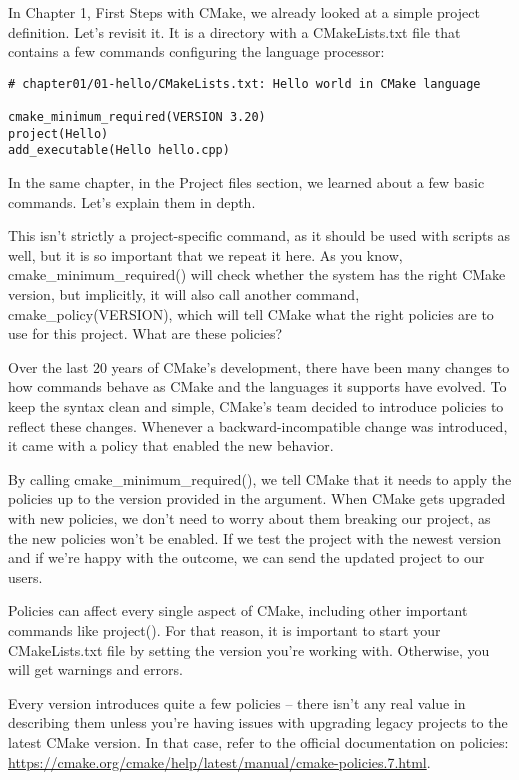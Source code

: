 
In Chapter 1, First Steps with CMake, we already looked at a simple project definition. Let's revisit it. It is a directory with a CMakeLists.txt file that contains a few commands configuring the language processor:

\begin{lstlisting}[style=styleCMake]
# chapter01/01-hello/CMakeLists.txt: Hello world in CMake language

cmake_minimum_required(VERSION 3.20)
project(Hello)
add_executable(Hello hello.cpp)
\end{lstlisting}

In the same chapter, in the Project files section, we learned about a few basic commands. Let's explain them in depth.


This isn't strictly a project-specific command, as it should be used with scripts as well, but it is so important that we repeat it here. As you know, cmake\_minimum\_required() will check whether the system has the right CMake version, but implicitly, it will also call another command, cmake\_policy(VERSION), which will tell CMake what the right policies are to use for this project. What are these policies?

Over the last 20 years of CMake's development, there have been many changes to how commands behave as CMake and the languages it supports have evolved. To keep the syntax clean and simple, CMake's team decided to introduce policies to reflect these changes. Whenever a backward-incompatible change was introduced, it came with a policy that enabled the new behavior.

By calling cmake\_minimum\_required(), we tell CMake that it needs to apply the policies up to the version provided in the argument. When CMake gets upgraded with new policies, we don't need to worry about them breaking our project, as the new policies won't be enabled. If we test the project with the newest version and if we're happy with the outcome, we can send the updated project to our users.

Policies can affect every single aspect of CMake, including other important commands like project(). For that reason, it is important to start your CMakeLists.txt file by setting the version you're working with. Otherwise, you will get warnings and errors.

Every version introduces quite a few policies – there isn't any real value in describing them unless you're having issues with upgrading legacy projects to the latest CMake version. In that case, refer to the official documentation on policies: \url{https://cmake.org/cmake/help/latest/manual/cmake-policies.7.html}.

